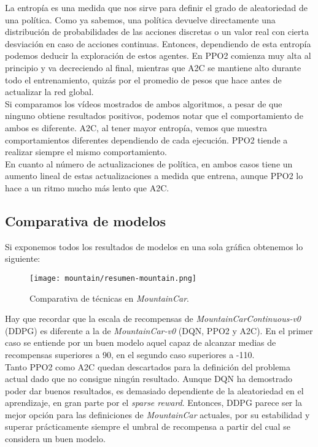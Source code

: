 \documentclass[11pt,fleqn]{book} %
\begin{document}
La entropía es una medida que nos sirve para definir el grado de aleatoriedad de una política. Como ya sabemos, una política devuelve directamente una distribución de probabilidades de las acciones discretas o un valor real con cierta desviación en caso de acciones continuas. Entonces, dependiendo de esta entropía podemos deducir la exploración de estos agentes. En PPO2 comienza muy alta al principio y va decreciendo al final, mientras que A2C se mantiene alto durante todo el entrenamiento, quizás por el promedio de pesos que hace antes de actualizar la red global. \\

Si comparamos los vídeos mostrados de ambos algoritmos, a pesar de que ninguno obtiene resultados positivos, podemos notar que el comportamiento de ambos es diferente. A2C, al tener mayor entropía, vemos que muestra comportamientos diferentes dependiendo de cada ejecución. PPO2 tiende a realizar siempre el mismo comportamiento. \\

En cuanto al número de actualizaciones de política, en ambos casos tiene un aumento lineal de estas actualizaciones a medida que entrena, aunque PPO2 lo hace a un ritmo mucho más lento que A2C. \\

\subsection{Comparativa de modelos}

Si exponemos todos los resultados de modelos en una sola gráfica obtenemos lo siguiente:

\begin{figure}[H]
	\centering\texttt{[image: mountain/resumen-mountain.png]}
	\caption{Comparativa de técnicas en \textit{MountainCar}.}
	\label{fig:mountainresumen} %
\end{figure}

Hay que recordar que la escala de recompensas de \textit{MountainCarContinuous-v0} (DDPG) es diferente a la de \textit{MountainCar-v0} (DQN, PPO2 y A2C). En el primer caso se entiende por un buen modelo aquel capaz de alcanzar medias de recompensas superiores a 90, en el segundo caso superiores a -110. \\

Tanto PPO2 como A2C quedan descartados para la definición del problema actual dado que no consigue ningún resultado. Aunque DQN ha demostrado poder dar buenos resultados, es demasiado dependiente de la aleatoriedad en el aprendizaje, en gran parte por el \textit{sparse reward}. Entonces, DDPG parece ser la mejor opción para las definiciones de \textit{MountainCar} actuales, por su estabilidad y superar prácticamente siempre el umbral de recompensa a partir del cual se considera un buen modelo.
\end{document}
